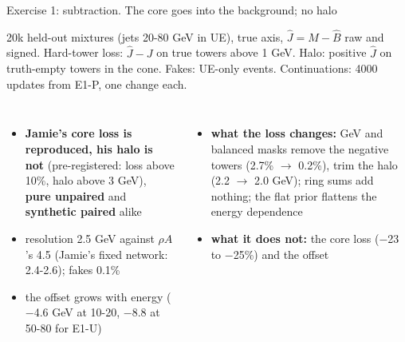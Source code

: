 \documentclass[aspectratio=169,10pt]{beamer}
\newcommand{\suplab}[2]{{\setlength{\fboxsep}{1.2pt}\colorbox{#1!14}{\scriptsize\color{#1!80!black}\textbf{#2}}}}
\newcommand{\UP}{\suplab{cUP}{pure unpaired}}
\newcommand{\SP}{\suplab{cSP}{synthetic paired}}
\newcommand{\snote}[1]{{\scriptsize\color{ink2}#1\par}}
\newcommand{\fittab}[2]{\resizebox{#1}{!}{}}
\begin{document}
\begin{frame}{Exercise 1: subtraction. The core goes into the background; no halo}
\begin{center}
\fittab{0.92\textwidth}{tables/ex1.tex}
\end{center}
\vspace{-0.2em}
\snote{20k held-out mixtures (jets 20-80 GeV in UE), true axis, $\hat J = M - \hat B$ raw and signed.
Hard-tower loss: $\hat J - J$ on true towers above 1 GeV. Halo: positive $\hat J$ on truth-empty towers in
the cone. Fakes: UE-only events. Continuations: 4000 updates from E1-P, one change each.}
\vspace{0.3em}
\scriptsize
\begin{columns}[T]
\begin{itemize}\setlength\itemsep{0.15em}
\item \textbf{Jamie's core loss is reproduced, his halo is not} (pre-registered: loss above 10\%, halo
  above 3 GeV), \UP{} and \SP{} alike
\item resolution 2.5 GeV against $\rho A$'s 4.5 (Jamie's fixed network: 2.4-2.6); fakes 0.1\%
\item the offset grows with energy ($-$4.6 GeV at 10-20, $-$8.8 at 50-80 for E1-U)
\end{itemize}
\begin{itemize}\setlength\itemsep{0.15em}
\item \textbf{what the loss changes:} GeV and balanced masks remove the negative towers (2.7\% $\to$
  0.2\%), trim the halo (2.2 $\to$ 2.0 GeV); ring sums add nothing; the flat prior flattens the energy
  dependence
\item \textbf{what it does not:} the core loss ($-$23 to $-$25\%) and the offset
\end{itemize}
\end{columns}
\end{frame}
\end{document}
